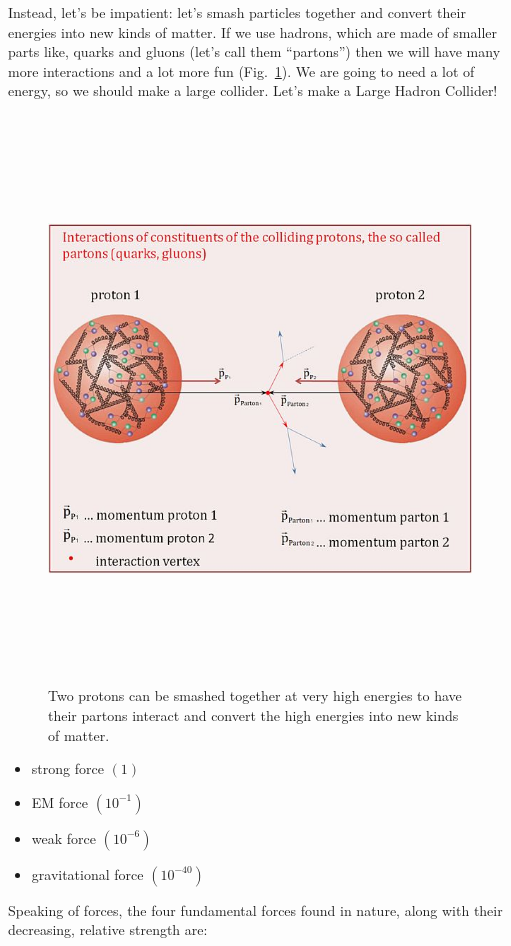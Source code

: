 Instead, let's be impatient: 
let's smash particles together and convert their energies into new kinds of matter. 
If we use hadrons, which are made of smaller parts like, quarks and gluons 
(let's call them ``partons'') then we will have many more interactions and a lot more fun (Fig.~\ref{fig:pp_collision}).
We are going to need a lot of energy, so we should make a large collider. 
Let's make a Large Hadron Collider!
\begin{figure}[pbth]
\centering
\includegraphics[width=15cm,height=15cm,keepaspectratio]{figures/lhc/proton_proton_quarksandgluons.jpg}
    \caption{
    Two protons can be smashed together at very high energies to have their partons interact and convert the high energies into new kinds of matter.} 
    \label{fig:pp_collision}
\end{figure}


\begin{itemize}
    \item strong force $(1)$
    \item EM force $(10^{-1})$
    \item weak force $(10^{-6})$
    \item gravitational force $(10^{-40})$
\end{itemize}
Speaking of forces, the four fundamental forces found in nature, along with their decreasing, relative strength are: 


